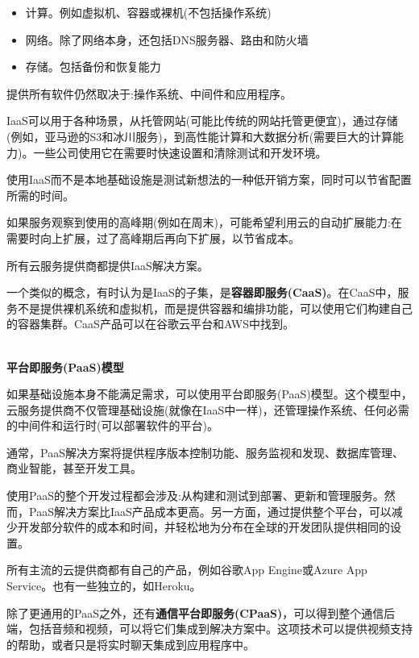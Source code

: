 \begin{itemize}
\item 
计算。例如虚拟机、容器或裸机(不包括操作系统)

\item 
网络。除了网络本身，还包括DNS服务器、路由和防火墙

\item 
存储。包括备份和恢复能力
\end{itemize}

提供所有软件仍然取决于:操作系统、中间件和应用程序。

IaaS可以用于各种场景，从托管网站(可能比传统的网站托管更便宜)，通过存储(例如，亚马逊的S3和冰川服务)，到高性能计算和大数据分析(需要巨大的计算能力)。一些公司使用它在需要时快速设置和清除测试和开发环境。

使用IaaS而不是本地基础设施是测试新想法的一种低开销方案，同时可以节省配置所需的时间。

如果服务观察到使用的高峰期(例如在周末)，可能希望利用云的自动扩展能力:在需要时向上扩展，过了高峰期后再向下扩展，以节省成本。

所有云服务提供商都提供IaaS解决方案。

一个类似的概念，有时认为是IaaS的子集，是\textbf{容器即服务(CaaS)}。在CaaS中，服务不是提供裸机系统和虚拟机，而是提供容器和编排功能，可以使用它们构建自己的容器集群。CaaS产品可以在谷歌云平台和AWS中找到。

\hspace*{\fill} \\ %
\noindent
\textbf{平台即服务(PaaS)模型}

如果基础设施本身不能满足需求，可以使用平台即服务(PaaS)模型。这个模型中，云服务提供商不仅管理基础设施(就像在IaaS中一样)，还管理操作系统、任何必需的中间件和运行时(可以部署软件的平台)。

通常，PaaS解决方案将提供程序版本控制功能、服务监视和发现、数据库管理、商业智能，甚至开发工具。

使用PaaS的整个开发过程都会涉及:从构建和测试到部署、更新和管理服务。然而，PaaS解决方案比IaaS产品成本更高。另一方面，通过提供整个平台，可以减少开发部分软件的成本和时间，并轻松地为分布在全球的开发团队提供相同的设置。

所有主流的云提供商都有自己的产品，例如谷歌App Engine或Azure App Service。也有一些独立的，如Heroku。

除了更通用的PaaS之外，还有\textbf{通信平台即服务(CPaaS)}，可以得到整个通信后端，包括音频和视频，可以将它们集成到解决方案中。这项技术可以提供视频支持的帮助，或者只是将实时聊天集成到应用程序中。


